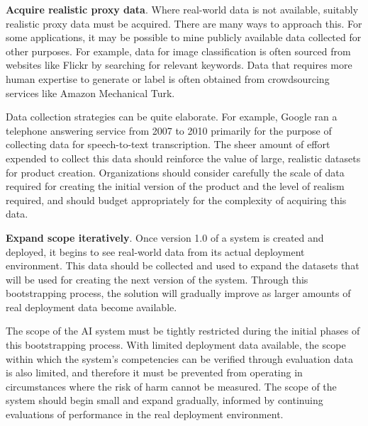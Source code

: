 \textbf{Acquire realistic proxy data}. Where real-world data is not available, suitably realistic proxy data must be acquired. There are many ways to approach this. For some applications, it may be possible to mine publicly available data collected for other purposes. For example, data for image classification is often sourced from websites like Flickr by searching for relevant keywords. Data that requires more human expertise to generate or label is often obtained from crowdsourcing services like Amazon Mechanical Turk. 

Data collection strategies can be quite elaborate. For example, Google ran a telephone answering service from 2007 to 2010 primarily for the purpose of collecting data for speech-to-text transcription. The sheer amount of effort expended to collect this data should reinforce the value of large, realistic datasets for product creation. Organizations should consider carefully the scale of data required for creating the initial version of the product and the level of realism required, and should budget appropriately for the complexity of acquiring this data.

\textbf{Expand scope iteratively}. Once version 1.0 of a system is created and deployed, it begins to see real-world data from its actual deployment environment. This data should be collected and used to expand the datasets that will be used for creating the next version of the system. Through this bootstrapping process, the solution will gradually improve as larger amounts of real deployment data become available.

The scope of the AI system must be tightly restricted during the initial phases of this bootstrapping process. With limited deployment data available, the scope within which the system's competencies can be verified through evaluation data is also limited, and therefore it must be prevented from operating in circumstances where the risk of harm cannot be measured. The scope of the system should begin small and expand gradually, informed by continuing evaluations of performance in the real deployment environment.



